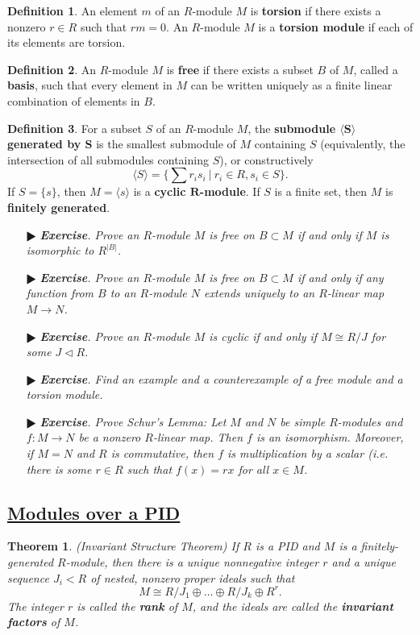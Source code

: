 \documentclass[11pt]{amsart}
\newtheorem*{theorem*}{Theorem}
\theoremstyle{definition}
\newtheorem*{definition*}{Definition}
\renewcommand\:{\colon}
\newcommand{\1}{\mathds{1}}
\newcommand{\exc}[1]{\vspace{-2.5pt}\begin{itemize}[leftmargin=15pt]\item[$\RHD$] \textit{\textbf{Exercise}. #1}\end{itemize}}
\begin{document}
\begin{definition*}
	An element $m$ of an $R$-module $M$ is \textbf{torsion} if there exists a nonzero $r \in R$ such that $rm = 0$. An $R$-module $M$ is a \textbf{torsion module} if each of its elements are torsion.
\end{definition*}

\begin{definition*}
	An $R$-module $M$ is \textbf{free} if there exists a subset $B$ of $M$, called a \textbf{basis}, such that every element in $M$ can be written uniquely as a finite linear combination of elements in $B$.
\end{definition*}

\begin{definition*}
	For a subset $S$ of an $R$-module $M$, the \textbf{submodule $\boldsymbol{\langle S \rangle}$ generated by $\boldsymbol{S}$} is the smallest submodule of $M$ containing $S$ (equivalently, the intersection of all submodules containing $S$), or constructively
		\[ \langle S \rangle = \Big\{ \sum r_is_i \ \Big| \ r_i \in R, s_i \in S \Big\}. \]
	If $S = \{s\}$, then $M = \langle s \rangle$ is a \textbf{cyclic $\boldsymbol{R}$-module}. If $S$ is a finite set, then $M$ is \textbf{finitely generated}.
\end{definition*}

\exc{Prove an $R$-module $M$ is free on $B \subset M$ if and only if $M$ is isomorphic to $R^{|B|}$.}
\exc{Prove an $R$-module $M$ is free on $B \subset M$ if and only if any function from $B$ to an $R$-module $N$ extends uniquely to an $R$-linear map $M \to N$.}
\exc{Prove an $R$-module $M$ is cyclic if and only if $M \cong R/J$ for some $J \triangleleft R$.}
\exc{Find an example and a counterexample of a free module and a torsion module.}
\exc{Prove Schur's Lemma: Let $M$ and $N$ be simple $R$-modules and $f\: M \to N$ be a nonzero $R$-linear map. Then $f$ is an isomorphism. Moreover, if $M = N$ and $R$ is commutative, then $f$ is multiplication by a scalar (i.e. there is some $r \in R$ such that $f(x) = rx$ for all $x \in M$.}

\vskip20pt

\subsection*{\underline{Modules over a PID}}

\begin{theorem*}
	\textnormal{(Invariant Structure Theorem)} If $R$ is a PID and $M$ is a finitely-generated $R$-module, then there is a unique nonnegative integer $r$ and a unique sequence $J_i < R$ of nested, nonzero proper ideals such that
		\[ M \cong R/J_1 \oplus \dots \oplus R/J_k \oplus R^r. \]
	The integer $r$ is called the \textbf{rank} of $M$, and the ideals are called the \textbf{invariant factors} of $M$.
\end{theorem*}
\end{document}
